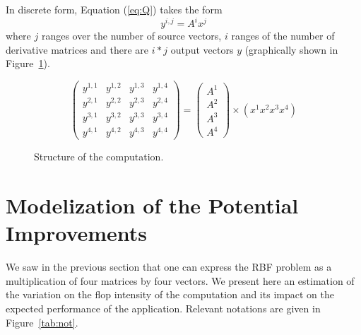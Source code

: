 \documentclass[10pt,conference,compsocconf]{IEEEtran}
\begin{document}
In discrete form, Equation (\ref{eq:Q}) takes the form
$$
  y^{i,j} = A^i x^j 
$$ where $j$ ranges over the number of source vectors, $i$ ranges of
  the number of derivative matrices and there are $i*j$ output vectors
  $y$ (graphically shown in Figure~\ref{fig:struct_comp}).

\begin{figure}
  \centering

  \[ \left( \begin{array}{cccc}
    y^{1,1} & y^{1,2} & y^{1,3} & y^{1,4} \\
    y^{2,1} & y^{2,2} & y^{2,3} & y^{2,4} \\
    y^{3,1} & y^{3,2} & y^{3,3} & y^{3,4} \\
    y^{4,1} & y^{4,2} & y^{4,3} & y^{4,4} 
  \end{array} \right)
  = \left(
  \begin{array}{c}
    A^1\\
    A^2\\
    A^3\\
    A^4
  \end{array}\right)
  \times \left(x^1 x^2 x^3 x^4 \right) \] 
  
  \caption{Structure of the computation.}
  \label{fig:struct_comp}
\end{figure}


\section{Modelization of the Potential Improvements}
\label{sec:model}

We saw in the previous section that one can express the RBF problem as
a multiplication of four matrices by four vectors. We present here an
estimation of the variation on the flop intensity of the computation
and its impact on the expected performance of the
application. Relevant notations are given in Figure~\ref{tab:not}.
\end{document}
